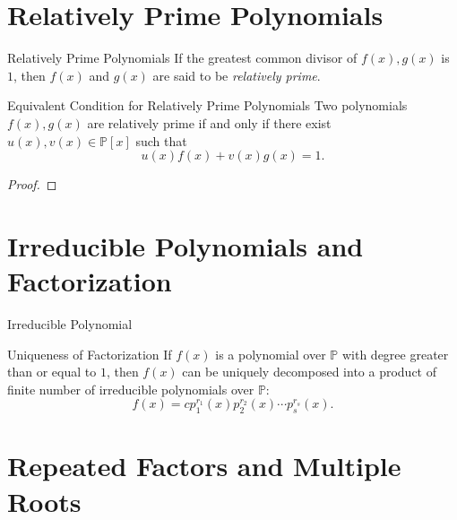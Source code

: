 \section{Relatively Prime Polynomials}

\begin{definition}{Relatively Prime Polynomials}{}
  If the greatest common divisor of $f(x), g(x)$ is $1$,
  then $f(x)$ and $g(x)$ are said to be \emph{relatively prime}.
\end{definition}

\begin{proposition}{Equivalent Condition for Relatively Prime Polynomials}{}
  Two polynomials $f(x), g(x)$ are relatively prime if and only if
  there exist $u(x), v(x) \in \mathbb{P}[x]$ such that
  \begin{equation}
    u(x)f(x) + v(x)g(x) = 1.
  \end{equation}
\end{proposition}

\begin{proof}
  
\end{proof}

\section{Irreducible Polynomials and Factorization}

\begin{definition}{Irreducible Polynomial}{}
  
\end{definition}

\begin{theorem}{Uniqueness of Factorization}{}
  If $f(x)$ is a polynomial over $\mathbb{P}$ with degree greater than or equal
  to $1$, then $f(x)$ can be uniquely decomposed into a product of finite number
  of irreducible polynomials over $\mathbb{P}$:
  \begin{equation}
    f(x) = cp_1^{r_1}(x) p_2^{r_2}(x) \cdots p_s^{r_s}(x).
  \end{equation}
\end{theorem}

\section{Repeated Factors and Multiple Roots}






